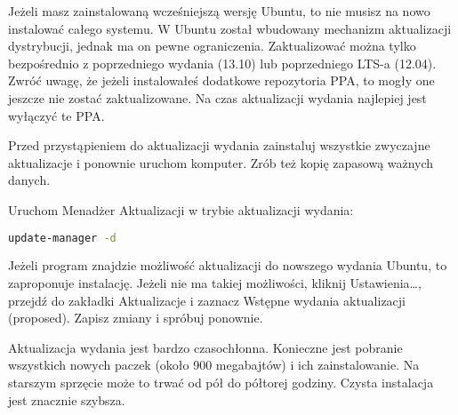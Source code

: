 Jeżeli masz zainstalowaną wcześniejszą wersję Ubuntu, to nie musisz na nowo instalować całego systemu. W Ubuntu został wbudowany mechanizm aktualizacji dystrybucji, jednak ma on pewne ograniczenia. Zaktualizować można tylko bezpośrednio z poprzedniego wydania (13.10) lub poprzedniego LTS-a (12.04). Zwróć uwagę, że jeżeli instalowałeś dodatkowe repozytoria PPA, to mogły one jeszcze nie zostać zaktualizowane. Na czas aktualizacji wydania najlepiej jest wyłączyć te PPA.

Przed przystąpieniem do aktualizacji wydania zainstaluj wszystkie zwyczajne aktualizacje i ponownie uruchom komputer. Zrób też kopię zapasową ważnych danych.

Uruchom Menadżer Aktualizacji w trybie aktualizacji wydania:

\begin{lstlisting}[language=bash]
update-manager -d
\end{lstlisting}

Jeżeli program znajdzie możliwość aktualizacji do nowszego wydania Ubuntu, to zaproponuje instalację. Jeżeli nie ma takiej możliwości, kliknij \textcolor{ubuntu_orange}{Ustawienia\ldots}, przejdź do zakładki \textcolor{ubuntu_orange}{Aktualizacje} i zaznacz \textcolor{ubuntu_orange}{Wstępne wydania aktualizacji (proposed)}. Zapisz zmiany i spróbuj ponownie.

Aktualizacja wydania jest bardzo czasochłonna. Konieczne jest pobranie wszystkich nowych paczek (około 900 megabajtów) i ich zainstalowanie. Na starszym sprzęcie może to trwać od pół do półtorej godziny. Czysta instalacja jest znacznie szybsza.

